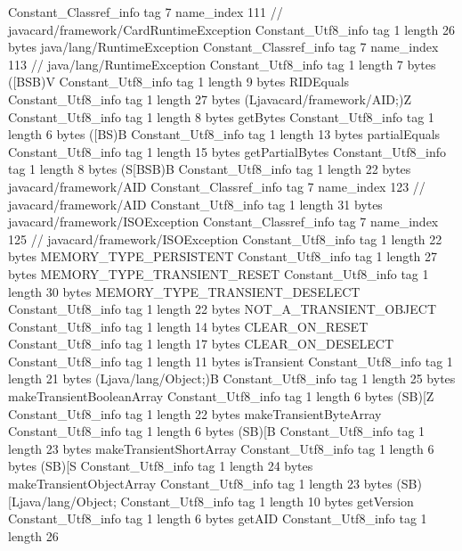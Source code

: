 {{{		}
		Constant_Classref_info {
			tag	7
			name_index	111		// javacard/framework/CardRuntimeException
		}
		Constant_Utf8_info {
			tag	1
			length	26
			bytes	java/lang/RuntimeException
		}
		Constant_Classref_info {
			tag	7
			name_index	113		// java/lang/RuntimeException
		}
		Constant_Utf8_info {
			tag	1
			length	7
			bytes	([BSB)V
		}
		Constant_Utf8_info {
			tag	1
			length	9
			bytes	RIDEquals
		}
		Constant_Utf8_info {
			tag	1
			length	27
			bytes	(Ljavacard/framework/AID;)Z
		}
		Constant_Utf8_info {
			tag	1
			length	8
			bytes	getBytes
		}
		Constant_Utf8_info {
			tag	1
			length	6
			bytes	([BS)B
		}
		Constant_Utf8_info {
			tag	1
			length	13
			bytes	partialEquals
		}
		Constant_Utf8_info {
			tag	1
			length	15
			bytes	getPartialBytes
		}
		Constant_Utf8_info {
			tag	1
			length	8
			bytes	(S[BSB)B
		}
		Constant_Utf8_info {
			tag	1
			length	22
			bytes	javacard/framework/AID
		}
		Constant_Classref_info {
			tag	7
			name_index	123		// javacard/framework/AID
		}
		Constant_Utf8_info {
			tag	1
			length	31
			bytes	javacard/framework/ISOException
		}
		Constant_Classref_info {
			tag	7
			name_index	125		// javacard/framework/ISOException
		}
		Constant_Utf8_info {
			tag	1
			length	22
			bytes	MEMORY_TYPE_PERSISTENT
		}
		Constant_Utf8_info {
			tag	1
			length	27
			bytes	MEMORY_TYPE_TRANSIENT_RESET
		}
		Constant_Utf8_info {
			tag	1
			length	30
			bytes	MEMORY_TYPE_TRANSIENT_DESELECT
		}
		Constant_Utf8_info {
			tag	1
			length	22
			bytes	NOT_A_TRANSIENT_OBJECT
		}
		Constant_Utf8_info {
			tag	1
			length	14
			bytes	CLEAR_ON_RESET
		}
		Constant_Utf8_info {
			tag	1
			length	17
			bytes	CLEAR_ON_DESELECT
		}
		Constant_Utf8_info {
			tag	1
			length	11
			bytes	isTransient
		}
		Constant_Utf8_info {
			tag	1
			length	21
			bytes	(Ljava/lang/Object;)B
		}
		Constant_Utf8_info {
			tag	1
			length	25
			bytes	makeTransientBooleanArray
		}
		Constant_Utf8_info {
			tag	1
			length	6
			bytes	(SB)[Z
		}
		Constant_Utf8_info {
			tag	1
			length	22
			bytes	makeTransientByteArray
		}
		Constant_Utf8_info {
			tag	1
			length	6
			bytes	(SB)[B
		}
		Constant_Utf8_info {
			tag	1
			length	23
			bytes	makeTransientShortArray
		}
		Constant_Utf8_info {
			tag	1
			length	6
			bytes	(SB)[S
		}
		Constant_Utf8_info {
			tag	1
			length	24
			bytes	makeTransientObjectArray
		}
		Constant_Utf8_info {
			tag	1
			length	23
			bytes	(SB)[Ljava/lang/Object;
		}
		Constant_Utf8_info {
			tag	1
			length	10
			bytes	getVersion
		}
		Constant_Utf8_info {
			tag	1
			length	6
			bytes	getAID
		}
		Constant_Utf8_info {
			tag	1
			length	26
}}}
